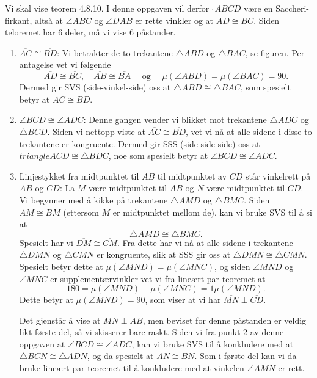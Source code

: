 \begin{oppgave}[4.8.5]
    Vi skal vise teorem 4.8.10. I denne oppgaven vil derfor $\square ABCD$ være en Saccheri-firkant, altså at $\angle ABC$ og $\angle DAB$ er rette vinkler og at $\overline{AD}\cong \overline{BC}$. 
    Siden teloremet har 6 deler, må vi vise 6 påstander. 
    \begin{enumerate}
        \item $\overline{AC}\cong \overline{BD}$: 
        Vi betrakter de to trekantene $\triangle ABD$ og $\triangle BAC$, se figuren. 
        Per antagelse vet vi følgende
        $$\overline{AD}\cong \overline{BC},\quad \overline{AB}\cong \overline{BA}\quad \text{ og } \quad\mu(\angle ABD)=\mu(\angle BAC)=90.$$
        Dermed gir SVS (side-vinkel-side) oss at $\triangle ABD\cong \triangle BAC$, som spesielt betyr at $\overline{AC}\cong \overline{BD}$. 

        \item $\angle BCD \cong \angle ADC$: 
        Denne gangen vender vi blikket mot trekantene $\triangle ADC$ og $\triangle BCD$. 
        Siden vi nettopp viste at $\overline{AC}\cong \overline{BD}$, vet vi nå at alle sidene i disse to trekantene er kongruente. 
        Dermed gir SSS (side-side-side) oss at ${triangle ACD}\cong \triangle BDC$, noe som spesielt betyr at $\angle BCD \cong \angle ADC$. 

        \item Linjestykket fra midtpunktet til $\overline{AB}$ til midtpunktet av $\overline{CD}$ står vinkelrett på $\overline{AB}$ og $\overline{CD}$: 
        La $M$ være midtpunktet til $\overline{AB}$ og $N$ være midtpunktet til $\overline{CD}$. 
        Vi begynner med å kikke på trekantene $\triangle AMD$ og $\triangle BMC$. 
        Siden $\overline{AM}\cong \overline{BM}$ (ettersom $M$ er midtpunktet mellom de), kan vi bruke SVS til å si at 
        $$\triangle AMD\cong \triangle BMC.$$
        Spesielt har vi $\overline{DM}\cong \overline{CM}$. 
        Fra dette har vi nå at alle sidene i trekantene $\triangle DMN$ og $\triangle CMN$ er kongruente, slik at SSS gir oss at $\triangle DMN \cong \triangle CMN$. 
        Spesielt betyr dette at $\mu(\angle MND)=\mu(\angle MNC)$, og siden $\angle MND$ og $\angle MNC$ er supplementærvinkler vet vi fra lineært par-teoremet at 
        $$ 180 = \mu(\angle MND)+\mu(\angle MNC)=1\mu(\angle MND).$$
        Dette betyr at $\mu(\angle MND)=90$, som viser at vi har $\overline{MN}\perp \overline{CD}$. 
        
        Det gjenstår å vise at $\overline{MN}\perp \overline{AB}$, men beviset for denne påstanden er veldig likt første del, så vi skisserer bare raskt. 
        Siden vi fra punkt 2 av denne oppgaven at $\angle BCD \cong \angle ADC$, kan vi bruke SVS til å konkludere med at $\triangle BCN \cong \triangle ADN$, og da spesielt at $\overline{AN}\cong \overline{BN}$. 
        Som i første del kan vi da bruke lineært par-teoremet til å konkludere med at vinkelen $\angle AMN$ er rett. 


\end{enumerate}
\end{oppgave}
